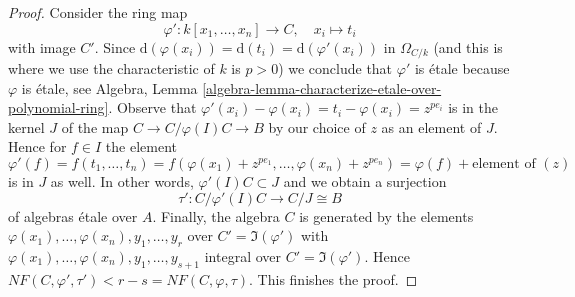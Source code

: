 \begin{proof}
\medskip\noindent
Consider the ring map
$$
\varphi' : k[x_1, \ldots, x_n] \longrightarrow C, \quad
x_i \longmapsto t_i
$$
with image $C'$. Since
$\text{d}(\varphi(x_i)) = \text{d}(t_i) = \text{d}(\varphi'(x_i))$
in $\Omega_{C/k}$ (and this is where we use the characteristic of $k$
is $p > 0$) we conclude that $\varphi'$ is \'etale because $\varphi$ is
\'etale, see
Algebra, Lemma \ref{algebra-lemma-characterize-etale-over-polynomial-ring}.
Observe that $\varphi'(x_i) - \varphi(x_i) = t_i - \varphi(x_i) = z^{pe_i}$
is in the kernel $J$ of the map $C \to C/\varphi(I)C \to B$ by our
choice of $z$ as an element of $J$.
Hence for $f \in I$ the element
$$
\varphi'(f) =
f(t_1, \ldots, t_n) =
f(\varphi(x_1) + z^{pe_1}, \ldots, \varphi(x_n) + z^{pe_n}) =
\varphi(f) + \text{element of }(z)
$$
is in $J$ as well. In other words, $\varphi'(I)C \subset J$ and
we obtain a surjection
$$
\tau' : C/\varphi'(I)C \longrightarrow C/J \cong B
$$
of algebras \'etale over $A$. Finally, the algebra
$C$ is generated by the elements
$\varphi(x_1), \ldots, \varphi(x_n), y_1, \ldots, y_r$
over $C' = \Im(\varphi')$ with
$\varphi(x_1), \ldots, \varphi(x_n), y_1, \ldots, y_{s + 1}$
integral over $C' = \Im(\varphi')$. Hence
$NF(C, \varphi', \tau') < r - s = NF(C, \varphi, \tau)$.
This finishes the proof.
\end{proof}